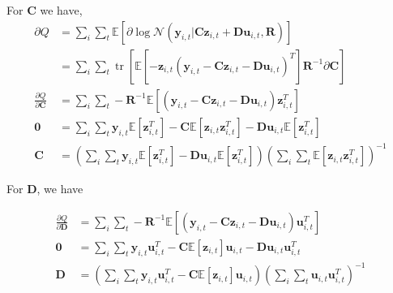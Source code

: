 \documentclass[a4paper,11pt]{article}
\DeclareMathOperator*{\tr}{tr}
\begin{document}
For $\mathbf{C}$ we have,
\begin{align*}
\partial Q &= \sum\limits_i\sum\limits_t \mathbb{E}\left[
  \partial \log \mathcal{N}(\mathbf{y}_{i,t}
    | \mathbf{C}\mathbf{z}_{i,t}+ \mathbf{D}\mathbf{u}_{i,t}, \mathbf{R}
  )
\right] \\
&= \sum\limits_i\sum\limits_t \tr\left[
  \mathbb{E}\left[
    - \mathbf{z}_{i,t}
    \left(\mathbf{y}_{i,t} - \mathbf{C}\mathbf{z}_{i,t} - \mathbf{D}\mathbf{u}_{i,t}\right)^T
  \right]
  \mathbf{R}^{-1}
  \partial \mathbf{C} 
\right] \\
\frac{\partial Q}{\partial \mathbf{C}} &= 
\sum\limits_i\sum\limits_t -\mathbf{R}^{-1} \mathbb{E}\left[
  \left(\mathbf{y}_{i,t} - \mathbf{C}\mathbf{z}_{i,t}- \mathbf{D}\mathbf{u}_{i,t}\right)
  \mathbf{z}_{i,t}^T
\right] \\
\mathbf{0} &= 
\sum\limits_i\sum\limits_t 
\mathbf{y}_{i,t} \mathbb{E}\left[\mathbf{z}_{i,t}^T\right]
- \mathbf{C} \mathbb{E}\left[\mathbf{z}_{i,t}\mathbf{z}_{i,t}^T\right]
- \mathbf{D}\mathbf{u}_{i,t}\mathbb{E}\left[\mathbf{z}_{i,t}^T\right] \\
\mathbf{C} &= \left(
\sum\limits_i\sum\limits_t 
  \mathbf{y}_{i,t} \mathbb{E}\left[\mathbf{z}_{i,t}^T\right]
  - \mathbf{D}\mathbf{u}_{i,t}\mathbb{E}\left[\mathbf{z}_{i,t}^T\right]
\right) \left(
  \sum\limits_i\sum\limits_t 
  \mathbb{E}\left[\mathbf{z}_{i,t}\mathbf{z}_{i,t}^T\right]
\right)^{-1}
\end{align*}

For $\mathbf{D}$, we have

\begin{align*}
\frac{\partial Q}{\partial \mathbf{D}} &= 
\sum\limits_i\sum\limits_t -\mathbf{R}^{-1} \mathbb{E}\left[
  \left(\mathbf{y}_{i,t} - \mathbf{C}\mathbf{z}_{i,t}- \mathbf{D}\mathbf{u}_{i,t}\right)
  \mathbf{u}_{i,t}^T
\right] \\
\mathbf{0} &= 
\sum\limits_i\sum\limits_t 
\mathbf{y}_{i,t} \mathbf{u}_{i,t}^T
- \mathbf{C} \mathbb{E}\left[\mathbf{z}_{i,t}\right]\mathbf{u}_{i,t}
- \mathbf{D}\mathbf{u}_{i,t}\mathbf{u}_{i,t}^T \\
\mathbf{D} &= \left(
  \sum\limits_i\sum\limits_t 
  \mathbf{y}_{i,t} \mathbf{u}_{i,t}^T
  - \mathbf{C} \mathbb{E}\left[\mathbf{z}_{i,t}\right] \mathbf{u}_{i,t}
\right) \left(
  \sum\limits_i\sum\limits_t 
  \mathbf{u}_{i,t}\mathbf{u}_{i,t}^T
\right)^{-1}
\\
\end{align*}
\end{document}

